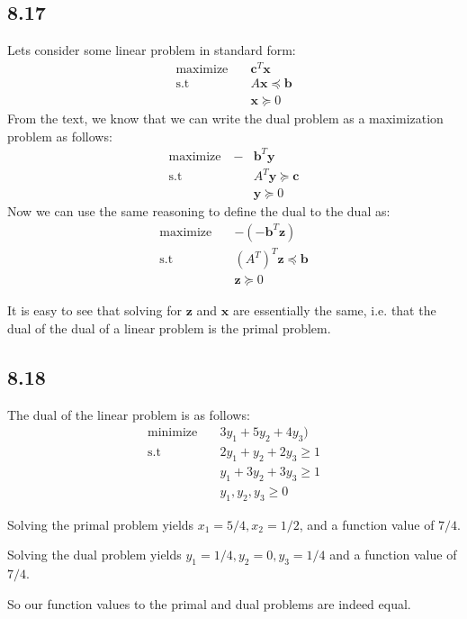 \documentclass{article}
\begin{document}
	 \subsection*{8.17}
	 Lets consider some linear problem in standard form:
	 \begin{align*}
	 \text{maximize} \quad &\mathbf{c}^T \mathbf{x} \\
	 \text{s.t} \quad &A \mathbf{x} \preceq \mathbf{b} \\
	 & \mathbf{x} \succeq 0
	 \end{align*}
	 From the text, we know that we can write the dual problem as a maximization problem as follows:
	 \begin{align*}
	 \text{maximize} \quad -&\mathbf{b}^T \mathbf{y} \\
	 \text{s.t} \quad &A^T \mathbf{y} \succeq \mathbf{c} \\
	 & \mathbf{y} \succeq 0
	 \end{align*}
	 Now we can use the same reasoning to define the dual to the dual as:
	 \begin{align*}
	 \text{maximize} \quad  &- (-\mathbf{b}^T \mathbf{z}) \\
	 \text{s.t} \quad &(A^T)^T \mathbf{z} \preceq \mathbf{b} \\
	 & \mathbf{z} \succeq 0
	 \end{align*}
	 
	 It is easy to see that solving for $\mathbf{z}$ and $\mathbf{x}$ are essentially the same, i.e. that the dual of the dual of a linear problem is the primal problem.
	 
	 \subsection*{8.18}
	 The dual of the linear problem is as follows:
	 \begin{align*}
	 \text{minimize} \quad & 3y_1 + 5y_2 + 4y_3)\\
	 \text{s.t} \quad & 2y_1 + y_2 + 2y_3 \geq 1 \\
	 & y_1 + 3y_2 + 3y_3 \geq 1 \\
	 &y_1, y_2, y_3 \geq 0
	 \end{align*}
	 
	 Solving the primal problem yields $x_1 = 5/4, x_2 = 1/2$, and a function value of $7/4$. 
	 
	 Solving the dual problem yields $y_1 = 1/4, y_2 = 0, y_3 = 1/4$ and a function value of $7/4$. 
	 
	 So our function values to the primal and dual problems are indeed equal.
	
\end{document}
